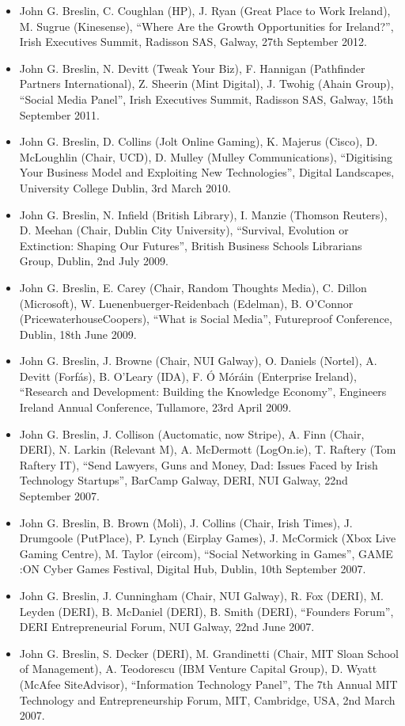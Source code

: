 \documentclass[10pt,a4paper]{res} %
\begin{document}
\begin{resume}
\begin{itemize}
\item John G. Breslin, C. Coughlan (HP), J. Ryan (Great Place to Work Ireland), M. Sugrue (Kinesense), ``Where Are the Growth Opportunities for Ireland?'', Irish Executives Summit, Radisson SAS, Galway, 27th September 2012.
\item John G. Breslin, N. Devitt (Tweak Your Biz), F. Hannigan (Pathfinder Partners International), Z. Sheerin (Mint Digital), J. Twohig (Ahain Group), ``Social Media Panel'', Irish Executives Summit, Radisson SAS, Galway, 15th September 2011.
\item John G. Breslin, D. Collins (Jolt Online Gaming), K. Majerus (Cisco), D. McLoughlin (Chair, UCD), D. Mulley (Mulley Communications), ``Digitising Your Business Model and Exploiting New Technologies'', Digital Landscapes, University College Dublin, 3rd March 2010.
\item John G. Breslin, N. Infield (British Library), I. Manzie (Thomson Reuters), D. Meehan (Chair, Dublin City University), ``Survival, Evolution or Extinction: Shaping Our Futures'', British Business Schools Librarians Group, Dublin, 2nd July 2009.
\item John G. Breslin, E. Carey (Chair, Random Thoughts Media), C. Dillon (Microsoft), W. Luenenbuerger-Reidenbach (Edelman), B. O'Connor (PricewaterhouseCoopers), ``What is Social Media'', Futureproof Conference, Dublin, 18th June 2009.
\item John G. Breslin, J. Browne (Chair, NUI Galway), O. Daniels (Nortel), A. Devitt (Forf\'{a}s), B. O'Leary (IDA), F. \'{O} M\'{o}r\'{a}in (Enterprise Ireland), ``Research and Development: Building the Knowledge Economy'', Engineers Ireland Annual Conference, Tullamore, 23rd April 2009.
\item John G. Breslin, J. Collison (Auctomatic, now Stripe), A. Finn (Chair, DERI), N. Larkin (Relevant M), A. McDermott (LogOn.ie), T. Raftery (Tom Raftery IT), ``Send Lawyers, Guns and Money, Dad: Issues Faced by Irish Technology Startups'', BarCamp Galway, DERI, NUI Galway, 22nd September 2007.
\item John G. Breslin, B. Brown (Moli), J. Collins (Chair, Irish Times), J. Drumgoole (PutPlace), P. Lynch (Eirplay Games), J. McCormick (Xbox Live Gaming Centre), M. Taylor (eircom), ``Social Networking in Games'', GAME :ON Cyber Games Festival, Digital Hub, Dublin, 10th September 2007.
\item John G. Breslin, J. Cunningham (Chair, NUI Galway), R. Fox (DERI), M. Leyden (DERI), B. McDaniel (DERI), B. Smith (DERI), ``Founders Forum'', DERI Entrepreneurial Forum, NUI Galway, 22nd June 2007.
\item John G. Breslin, S. Decker (DERI), M. Grandinetti (Chair, MIT Sloan School of Management), A. Teodorescu (IBM Venture Capital Group), D. Wyatt (McAfee SiteAdvisor), ``Information Technology Panel'', The 7th Annual MIT Technology and Entrepreneurship Forum, MIT, Cambridge, USA, 2nd March 2007.
\end{itemize}


\end{resume}
\end{document}
